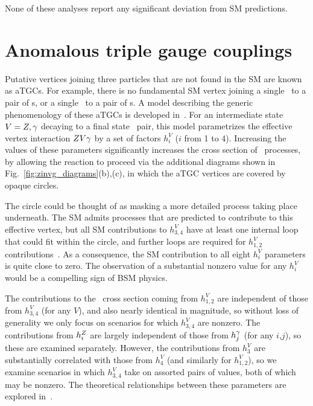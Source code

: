 \documentclass[oneside, letterpaper, 12pt, oldfontcommands]{memoir}
\begin{document}
None of these analyses report any significant deviation from SM predictions.

\section{Anomalous triple gauge couplings} \label{sec:introduction_aTGC}
Putative vertices joining three particles that are not found in the SM are known as aTGCs. For example, there is no fundamental SM vertex
joining a single \Pgamma\ to a pair of \PZ s, or a single \PZ\ to a pair of \Pgamma s. A model
describing the generic phenomenology of these aTGCs is developed in~\cite{ref:Nucl.Phys.0550-3213_87_90685-7, ref:PhysRevD.47.4889, ref:PhysRevD.62.113011}.
For an intermediate state $V = Z,\gamma$ decaying to a final state \PZ\Pgamma\ pair, this model parametrizes the effective vertex interaction $Z V\gamma$
by a set of factors $h_{i}^{V}$ ($i$ from 1 to 4). Increasing the values of these parameters significantly increases the cross section
of \zinvg\ processes, by allowing the reaction to proceed via the additional diagrams shown in Fig.~\ref{fig:zinvg_diagrams}(b),(c),
in which the aTGC vertices are covered by opaque circles.

The circle could be thought of as masking a more detailed process taking place underneath. The SM admits processes that are predicted to contribute
to this effective vertex, but all SM contributions to $h_{3,4}^{V}$ have at least one internal loop that could fit within the circle, and
further loops are required for $h_{1,2}^{V}$ contributions~\cite{ref:PhysRevD.47.4889}.
As a consequence, the SM contribution to all eight $h_{i}^{V}$ parameters is quite close to zero.
The observation of a substantial nonzero value for any $h_{i}^{V}$ would be a compelling sign of BSM physics.

The contributions to the \zinvg\ cross section coming from $h_{1,2}^{V}$ are independent of those from $h_{3,4}^{V}$ (for any $V$), and also nearly identical
in magnitude, so without loss of generality we only focus on scenarios for which $h_{3,4}^{V}$ are nonzero. The contributions
from $h_{i}^{Z}$ are largely independent of those from $h_{j}^{\gamma}$ (for any $i$,$j$), so these are examined separately.
However, the contributions from $h_{3}^{V}$ are substantially correlated with those from $h_{4}^{V}$ (and similarly for $h_{1,2}^{V}$), so we examine
scenarios in which $h_{3,4}^{V}$ take on assorted pairs of values, both of which may be nonzero. The theoretical relationships between these parameters
are explored in~\cite{ref:PhysRevD.47.4889}.
\end{document}
